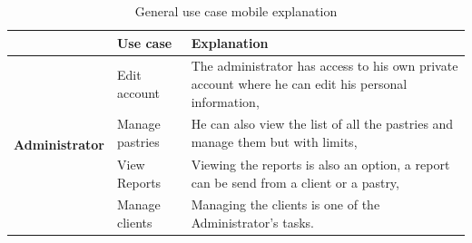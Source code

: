 \documentclass[12pt,a4paper]{report}
\begin{document}
	\begin{table}[H]
		\begin{center}
			\caption{\label{user-case-mobile-explanation} General use case mobile explanation} 
			\captionsetup[table]{skip=10pt}
			\setlength\doublerulesep{0.5pt}
			\begin{tabular}{|l|p{5cm}|p{8cm}| } 
				\hline\hline
				\rowcolor{LightCyan}
				& \textbf{Use case}      & \textbf{Explanation}                                                                                                                                \\
				\hline
				\hline
				\multirow{5}{*}{\textbf{Administrator} }
				
				& Edit account           & The administrator has access to his own private account where he can edit his personal information,                                                 \\
				\cline{2-3}
				& Manage pastries        & He can also view the list of all the pastries and manage them but with limits,                                                                      \\
				\cline{2-3}
				& View Reports           & Viewing the reports is also an option, a report can be send from a client or a pastry,                                                              \\
				\cline{2-3}
				& Manage clients         & Managing the clients is one of the Administrator's tasks.                                                                                           \\
				

\end{tabular}
\end{center}
\end{table}
\end{document}
